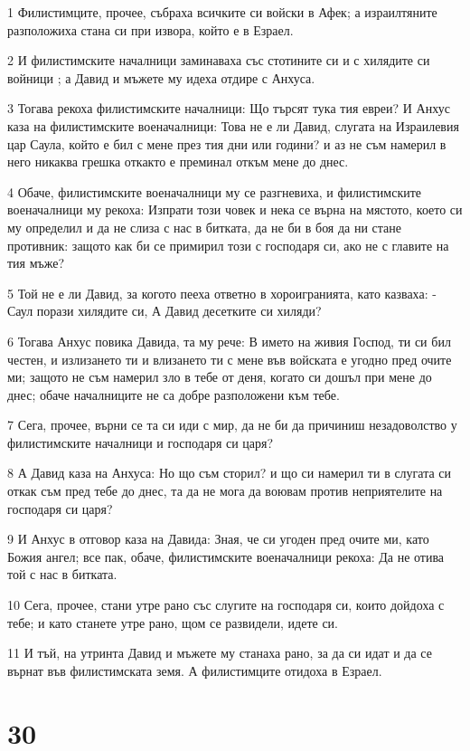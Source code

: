 \par 1 Филистимците, прочее, събраха всичките си войски в Афек; а израилтяните разположиха стана си при извора, който е в Езраел.
\par 2 И филистимските началници заминаваха със стотините си и с хилядите си войници ; а Давид и мъжете му идеха отдире с Анхуса.
\par 3 Тогава рекоха филистимските началници: Що търсят тука тия евреи? И Анхус каза на филистимските военачалници: Това не е ли Давид, слугата на Израилевия цар Саула, който е бил с мене през тия дни или години? и аз не съм намерил в него никаква грешка откакто е преминал откъм мене до днес.
\par 4 Обаче, филистимските военачалници му се разгневиха, и филистимските военачалници му рекоха: Изпрати този човек и нека се върна на мястото, което си му определил и да не слиза с нас в битката, да не би в боя да ни стане противник: защото как би се примирил този с господаря си, ако не с главите на тия мъже?
\par 5 Той не е ли Давид, за когото пееха ответно в хороигранията, като казваха: - Саул порази хилядите си, А Давид десетките си хиляди?
\par 6 Тогава Анхус повика Давида, та му рече: В името на живия Господ, ти си бил честен, и излизането ти и влизането ти с мене във войската е угодно пред очите ми; защото не съм намерил зло в тебе от деня, когато си дошъл при мене до днес; обаче началниците не са добре разположени към тебе.
\par 7 Сега, прочее, върни се та си иди с мир, да не би да причиниш незадоволство у филистимските началници и господаря си царя?
\par 8 А Давид каза на Анхуса: Но що съм сторил? и що си намерил ти в слугата си откак съм пред тебе до днес, та да не мога да воювам против неприятелите на господаря си царя?
\par 9 И Анхус в отговор каза на Давида: Зная, че си угоден пред очите ми, като Божия ангел; все пак, обаче, филистимските военачалници рекоха: Да не отива той с нас в битката.
\par 10 Сега, прочее, стани утре рано със слугите на господаря си, които дойдоха с тебе; и като станете утре рано, щом се развидели, идете си.
\par 11 И тъй, на утринта Давид и мъжете му станаха рано, за да си идат и да се върнат във филистимската земя. А филистимците отидоха в Езраел.

\chapter{30}

